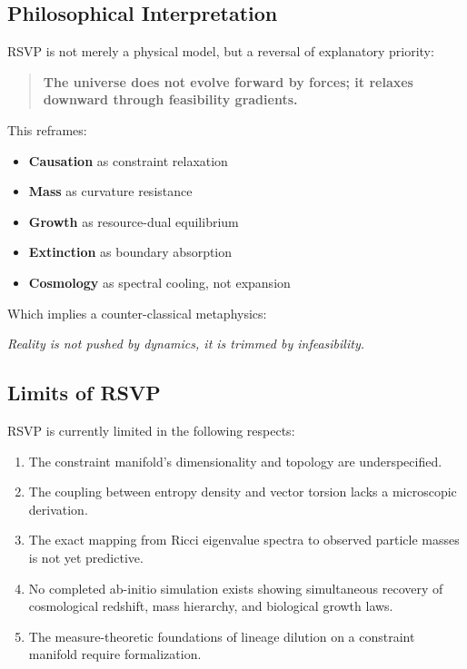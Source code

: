 \documentclass[11pt,a4paper]{article}
\begin{document}
\subsection{Philosophical Interpretation}

RSVP is not merely a physical model, but a reversal of explanatory priority:

\begin{quote}
\textbf{The universe does not evolve forward by forces; it relaxes downward through feasibility gradients.}
\end{quote}

This reframes:

\begin{itemize}
    \item \textbf{Causation} as constraint relaxation
    \item \textbf{Mass} as curvature resistance
    \item \textbf{Growth} as resource-dual equilibrium
    \item \textbf{Extinction} as boundary absorption
    \item \textbf{Cosmology} as spectral cooling, not expansion
\end{itemize}

Which implies a counter-classical metaphysics:

\begin{center}
\textit{Reality is not pushed by dynamics, it is trimmed by infeasibility.}
\end{center}

\subsection{Limits of RSVP}

RSVP is currently limited in the following respects:

\begin{enumerate}
    \item The constraint manifold’s dimensionality and topology are underspecified.
    \item The coupling between entropy density and vector torsion lacks a microscopic derivation.
    \item The exact mapping from Ricci eigenvalue spectra to observed particle masses is not yet predictive.
    \item No completed ab-initio simulation exists showing simultaneous recovery of cosmological redshift, mass hierarchy, and biological growth laws.
    \item The measure-theoretic foundations of lineage dilution on a constraint manifold require formalization.
\end{enumerate}
\end{document}
